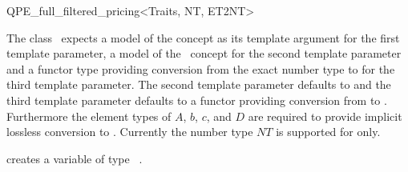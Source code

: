 \begin{ccRefClass}{QPE_full_filtered_pricing<Traits, NT, ET2NT>}

\ccInheritsFrom
{}

\ccRequirements
\ccIndexRequirements

The class \ccRefName\ expects a model of the concept
 as its template argument for the first template parameter,
a model of the \cgal \ concept  for the second template
parameter and a functor type
providing conversion from the exact number type  to 
for the third template parameter. The second template parameter defaults to
 and the third template parameter defaults to a functor providing
conversion from  to . Furthermore the element types
of $A$, $b$, $c$, and $D$ are required to provide implicit lossless conversion
to . Currently the number type $NT$ is supported for  only.  


\ccTypes \ccIndexClassTypes


\ccCreation
\ccIndexClassCreation
{}

{creates a variable of type \ccRefName\ .}


\ccUnchecked

\ccAccessFunctions
\begin{ccIndexMemberFunctions}




\ccModifiers
{}





\end{ccIndexMemberFunctions}

\ccSeeAlso
%


\end{ccRefClass}
